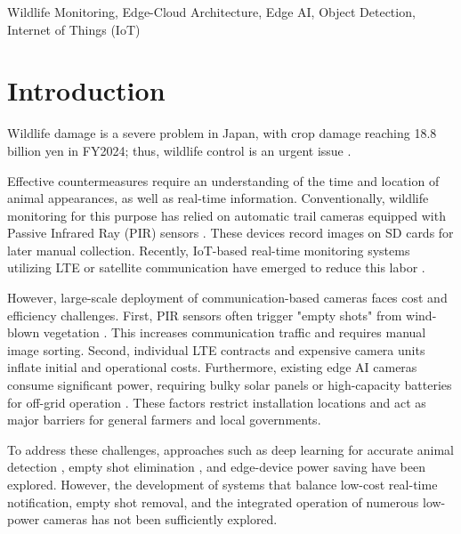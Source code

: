 \documentclass[conference]{IEEEtran}
\begin{document}
\begin{IEEEkeywords}
Wildlife Monitoring, Edge-Cloud Architecture, Edge AI, Object Detection, Internet of Things (IoT)
\end{IEEEkeywords}

\section{Introduction}
Wildlife damage is a severe problem in Japan, with crop damage reaching 18.8 billion yen in FY2024; thus, wildlife control is an urgent issue \cite{maff}.

Effective countermeasures require an understanding of the time and location of animal appearances, as well as real-time information. Conventionally, wildlife monitoring for this purpose has relied on automatic trail cameras equipped with Passive Infrared Ray (PIR) sensors \cite{Tabak2019,Beery2019,rs18030502}. These devices record images on SD cards for later manual collection. Recently, IoT-based real-time monitoring systems utilizing LTE or satellite communication have emerged to reduce this labor \cite{Whytock2023,Patkar2025,9345858}.

However, large-scale deployment of communication-based cameras faces cost and efficiency challenges. First, PIR sensors often trigger "empty shots" from wind-blown vegetation \cite{Beery2019}. This increases communication traffic and requires manual image sorting. Second, individual LTE contracts and expensive camera units inflate initial and operational costs. Furthermore, existing edge AI cameras consume significant power, requiring bulky solar panels or high-capacity batteries for off-grid operation \cite{Sato2022}. These factors restrict installation locations and act as major barriers for general farmers and local governments.

To address these challenges, approaches such as deep learning for accurate animal detection \cite{10394750,10126065}, empty shot elimination \cite{Tabak2019,Beery2019,VELASCOMONTERO2024102815}, and edge-device power saving \cite{IEICE2020,Sato2022,VELASCOMONTERO2024102815} have been explored. However, the development of systems that balance low-cost real-time notification, empty shot removal, and the integrated operation of numerous low-power cameras has not been sufficiently explored.
\end{document}
